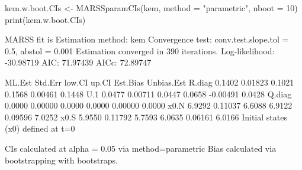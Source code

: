 \begin{Schunk}
\begin{Sinput}
 kem.w.boot.CIs <- MARSSparamCIs(kem, method = "parametric", nboot = 10)
 print(kem.w.boot.CIs)
\end{Sinput}
\begin{Soutput}
MARSS fit is
Estimation method: kem 
Convergence test: conv.test.slope.tol = 0.5, abstol = 0.001
Estimation converged in 390 iterations. 
Log-likelihood: -30.98719 
AIC: 71.97439   AICc: 72.89747   
 
       ML.Est Std.Err low.CI  up.CI Est.Bias Unbias.Est
R.diag 0.1402 0.01823 0.1021 0.1568  0.00461     0.1448
U.1    0.0477 0.00711 0.0447 0.0658 -0.00491     0.0428
Q.diag 0.0000 0.00000 0.0000 0.0000  0.00000     0.0000
x0.N   6.9292 0.11037 6.6088 6.9122  0.09596     7.0252
x0.S   5.9550 0.11792 5.7593 6.0635  0.06161     6.0166
Initial states (x0) defined at t=0

CIs calculated at alpha = 0.05 via method=parametric 
Bias calculated via  bootstrapping with  bootstraps. 
\end{Soutput}
\end{Schunk}
